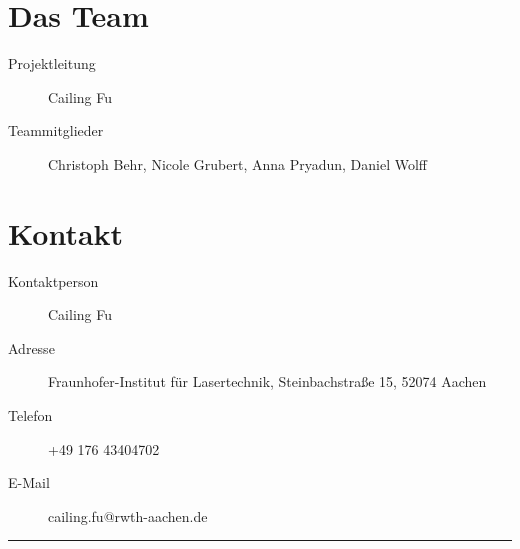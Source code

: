 \documentclass[a4paper,12pt,notumble]{leaflet}
\begin{document}
\noindent
\begin{minipage}[c][0.45\textheight][t]{\textwidth}
	\section{Das Team}
	\begin{description}
		\item[Projektleitung] Cailing Fu
		\item[Teammitglieder] Christoph Behr, Nicole Grubert, Anna Pryadun, Daniel Wolff
	\end{description}

	\section{Kontakt}
	\begin{description}
		\item[Kontaktperson] Cailing Fu 
		\item[Adresse] Fraunhofer-Institut für Lasertechnik, Steinbachstraße 15, 52074 Aachen
		\item[Telefon] +49 176 43404702
		\item[E-Mail] cailing.fu@rwth-aachen.de
	\end{description}
\end{minipage}

\textcolor{rwth-lblue}{\noindent\rule{\textwidth}{4pt}}
\end{document}
